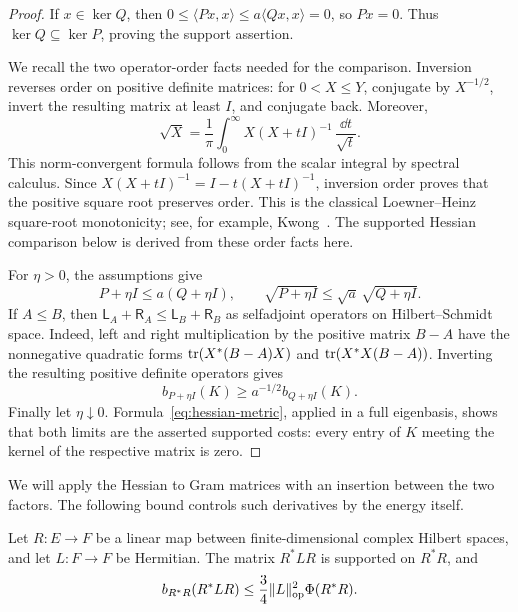 \begin{proof}
If $x\in\ker Q$, then $0\le\langle Px,x\rangle
\le a\langle Qx,x\rangle=0$, so $Px=0$.
Thus $\ker Q\subseteq\ker P$, proving the support assertion.

We recall the two operator-order facts needed for the comparison.
Inversion reverses order on positive definite matrices: for
$0<X\le Y$, conjugate by $X^{-1/2}$, invert the resulting matrix
at least $I$, and conjugate back.  Moreover,
\[
 \sqrt X=\frac1\pi\int_0^\infty
       X(X+tI)^{-1}\,\frac{\dd t}{\sqrt t}.
\]
This norm-convergent formula follows from the scalar integral by
spectral calculus.  Since
$X(X+tI)^{-1}=I-t(X+tI)^{-1}$, inversion order proves that the
positive square root preserves order. This is the classical
Loewner--Heinz square-root monotonicity; see, for example,
Kwong~\cite[Theorem~1 and Section~2]{Kwong1975}. The supported
Hessian comparison below is derived from these order facts here.

For $\eta>0$, the assumptions give
\[
 P+\eta I\le a(Q+\eta I),
 \qquad
 \sqrt{P+\eta I}\le\sqrt a\,\sqrt{Q+\eta I}.
\]
If $A\le B$, then
$\mathsf L_A+\mathsf R_A\le\mathsf L_B+\mathsf R_B$ as
selfadjoint operators on Hilbert--Schmidt space.  Indeed, left and
right multiplication by the positive matrix $B-A$ have the
nonnegative quadratic forms
$\operatorname{tr}(X^*(B-A)X)$ and $\operatorname{tr}(X^*X(B-A))$.
Inverting the resulting positive definite operators gives
\[
 b_{P+\eta I}(K)\ge a^{-1/2}b_{Q+\eta I}(K).
\]
Finally let $\eta\downarrow0$.
Formula~\eqref{eq:hessian-metric}, applied in a full eigenbasis,
shows that both limits are the asserted supported costs: every
entry of $K$ meeting the kernel of the respective matrix is zero.
\end{proof}

We will apply the Hessian to Gram matrices with an insertion between
the two factors.  The following bound controls such derivatives by
the energy itself.

\begin{lemma}\label{lem:insertion}
Let $R:E\to F$ be a linear map between finite-dimensional complex
Hilbert spaces, and let $L:F\to F$ be Hermitian.  The matrix $R^*LR$
is supported on $R^*R$, and
\begin{equation}\label{eq:insertion-bound}
 b_{R^*R}(R^*LR)
 \le\frac34\lVert L\rVert_{\mathrm{op}}^2\Phi(R^*R).
\end{equation}
\end{lemma}

